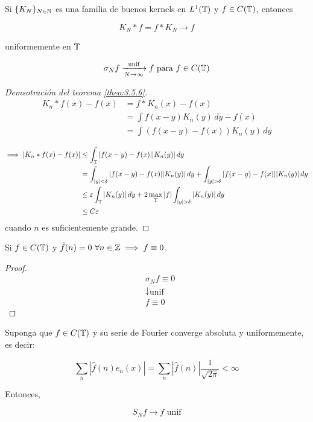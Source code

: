 \begin{ftheorem}
    Si $\{K_N\}_{N\in\mathbb{N}}$ es una familia de buenos kernels en $L^1(\mathbb{T})$ y $f\in C(\mathbb{T})$, entonces 

    \[K_N*f=f*K_N\to f\]

    uniformemente en $\mathbb{T}$
\end{ftheorem}

\begin{fcorollary}
    \[\sigma_N f\xrightarrow[N\to\infty]{\text{unif}} f\text{ para }f\in C(\mathbb{T})\]

\end{fcorollary}

\begin{proof}[Demsotración del teorema \ref{theo:3.5.6}]
    \begin{align*}
        K_n*f(x)-f(x)&=f*K_n(x)-f(x)\\
        &=\int f(x-y)K_n(y)\,dy-f(x)\\
        &=\int (f(x-y)-f(x))K_n(y)\,dy
    \end{align*}

    \begin{align*}
        \implies |K_n*f(x)-f(x)|&\leq \int_\T |f(x-y)-f(x)||K_n(y)|\,dy\\
        &=\int_{|y|<\delta} |f(x-y)-f(x)||K_n(y)|\,dy+\int_{|y|>\delta} |f(x-y)-f(x)||K_n(y)|\,dy\\
        &\leq \varepsilon\int_\mathbb{T} |K_n(y)|\,dy+2\max_\T |f|\int_{|y|>\delta}|K_n(y)|\,dy\\
        &\leq C\varepsilon
    \end{align*}
    cuando $n$ es suficientemente grande.
\end{proof}

\begin{fcorollary}
    Si $f\in C(\mathbb{T})$ y $\hat f(n)=0\ \forall n\in\mathbb{Z}\implies f\equiv 0$.
\end{fcorollary}

\begin{proof}
    \begin{align*}
        &\sigma_N f\equiv 0\\
        &\downarrow \text{unif}\\
        &f\equiv 0
    \end{align*}
\end{proof}

\begin{fcorollary}
    Suponga que $f\in C(\mathbb{T})$ y su serie de Fourier converge absoluta y uniformemente, es decir:

    \[\sum_n |\hat f(n) e_n(x)|=\sum_n |\hat f(n)|\frac{1}{\sqrt{2\pi}}<\infty\]

    Entonces, 

    \[S_N f\to f\text{ unif}\]
\end{fcorollary}

